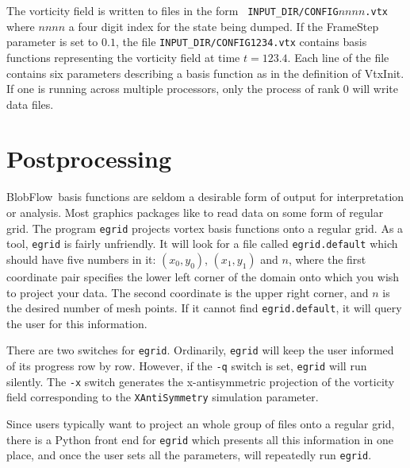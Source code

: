 \documentclass[12pt]{report}
\newcommand{\BF}{BlobFlow}
\begin{document}
The vorticity field is written to files in the form {\tt
INPUT\_DIR/CONFIG$nnnn$.vtx} where $nnnn$ a four digit index for the state
being dumped.  If the FrameStep parameter is set to $0.1$, the file
{\tt INPUT\_DIR/CONFIG1234.vtx} contains basis functions representing the
vorticity field at time $t=123.4$.  Each line of the file contains six
parameters describing a basis function as in the definition of VtxInit.  
If one is running across multiple
processors, only the process of rank 0 will write data files.

\section{Postprocessing}

\BF~basis functions are seldom a desirable form of output for
interpretation or analysis.  Most graphics packages like to read data on
some form of regular grid.  The program {\tt egrid} projects 
vortex basis functions onto a regular
grid.  As a tool, {\tt egrid} is fairly unfriendly.  It will look for a file
called {\tt egrid.default} which should have five numbers in it:
$(x_0,y_0)$, $(x_1,y_1)$ and $n$, where the first coordinate pair specifies
the lower left corner of the domain onto which you wish to project your
data.  The second coordinate is the upper right corner, and $n$ is the
desired number of mesh points.  If it cannot find {\tt egrid.default}, it
will query the user for this information.

There are two switches for {\tt egrid}.  Ordinarily, {\tt egrid}
will keep the user informed of its progress row by row.  However, if the
{\tt -q} switch is set, {\tt egrid} will run silently.  The {\tt -x}
switch generates the x-antisymmetric projection of the vorticity field
corresponding to the {\tt XAntiSymmetry} simulation parameter.

Since users typically want to project an whole group of files onto a regular
grid, there is a Python front end for {\tt egrid} which
presents all this information in one place, and once the user sets all the
parameters, will repeatedly run {\tt egrid}.

% 
\end{document}
